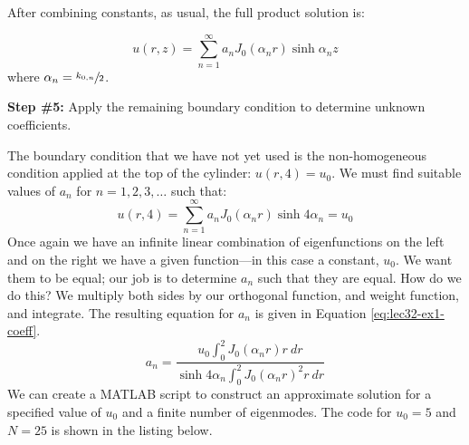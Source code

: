 \noindent After combining constants, as usual, the full product solution is:

\begin{equation}
u(r,z) = \sum\limits_{n=1}^{\infty} a_n J_0(\alpha_n r) \sinh{\alpha_n z}
\label{eq:lec32-ex1-sol}
\end{equation}
where $\alpha_n = \sfrac{k_{0,n}}{2}$.

\vspace{0.25cm}

\noindent\textbf{Step \#5:} Apply the remaining boundary condition to determine unknown coefficients.

\vspace{0.25cm}

\noindent The boundary condition that we have not yet used is the non-homogeneous condition applied at the top of the cylinder: $u(r,4) = u_0$.  We must find suitable values of $a_n$ for $n=1,2,3,\dots$ such that:
\begin{equation*}
u(r,4) = \sum\limits_{n=1}^{\infty}a_n J_0(\alpha_n r) \sinh{4\alpha_n} = u_0
\end{equation*}
Once again we have an infinite linear combination of eigenfunctions on the left and on the right we have a given function---in this case a constant, $u_0$.  We want them to be equal; our job is to determine $a_n$ such that they are equal.  How do we do this?  We multiply both sides by our orthogonal function, and weight function, and integrate.  The resulting equation for $a_n$ is given in Equation \ref{eq:lec32-ex1-coeff}.
\begin{equation}
a_n = \frac{u_0\int_0^2 J_0(\alpha_n r)r \ dr}{\sinh{4 \alpha_n}\int_0^2 J_0(\alpha_nr)^2 r \ dr}
\label{eq:lec32-ex1-coeff}
\end{equation}
We can create a MATLAB script to construct an approximate solution for a specified value of $u_0$ and a finite number of eigenmodes.  The code for $u_0 = 5$ and $N = 25$ is shown in the listing below.
